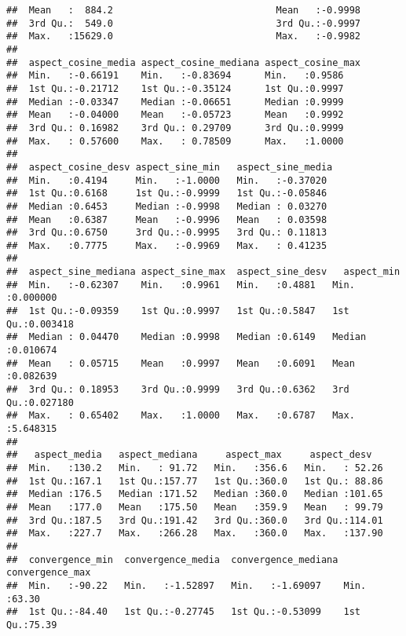 \documentclass[11pt,]{article}
\begin{document}
\begin{verbatim}
##  Mean   :  884.2                             Mean   :-0.9998  
##  3rd Qu.:  549.0                             3rd Qu.:-0.9997  
##  Max.   :15629.0                             Max.   :-0.9982  
##                                                               
##  aspect_cosine_media aspect_cosine_mediana aspect_cosine_max
##  Min.   :-0.66191    Min.   :-0.83694      Min.   :0.9586   
##  1st Qu.:-0.21712    1st Qu.:-0.35124      1st Qu.:0.9997   
##  Median :-0.03347    Median :-0.06651      Median :0.9999   
##  Mean   :-0.04000    Mean   :-0.05723      Mean   :0.9992   
##  3rd Qu.: 0.16982    3rd Qu.: 0.29709      3rd Qu.:0.9999   
##  Max.   : 0.57600    Max.   : 0.78509      Max.   :1.0000   
##                                                             
##  aspect_cosine_desv aspect_sine_min   aspect_sine_media 
##  Min.   :0.4194     Min.   :-1.0000   Min.   :-0.37020  
##  1st Qu.:0.6168     1st Qu.:-0.9999   1st Qu.:-0.05846  
##  Median :0.6453     Median :-0.9998   Median : 0.03270  
##  Mean   :0.6387     Mean   :-0.9996   Mean   : 0.03598  
##  3rd Qu.:0.6750     3rd Qu.:-0.9995   3rd Qu.: 0.11813  
##  Max.   :0.7775     Max.   :-0.9969   Max.   : 0.41235  
##                                                         
##  aspect_sine_mediana aspect_sine_max  aspect_sine_desv   aspect_min      
##  Min.   :-0.62307    Min.   :0.9961   Min.   :0.4881   Min.   :0.000000  
##  1st Qu.:-0.09359    1st Qu.:0.9997   1st Qu.:0.5847   1st Qu.:0.003418  
##  Median : 0.04470    Median :0.9998   Median :0.6149   Median :0.010674  
##  Mean   : 0.05715    Mean   :0.9997   Mean   :0.6091   Mean   :0.082639  
##  3rd Qu.: 0.18953    3rd Qu.:0.9999   3rd Qu.:0.6362   3rd Qu.:0.027180  
##  Max.   : 0.65402    Max.   :1.0000   Max.   :0.6787   Max.   :5.648315  
##                                                                          
##   aspect_media   aspect_mediana     aspect_max     aspect_desv    
##  Min.   :130.2   Min.   : 91.72   Min.   :356.6   Min.   : 52.26  
##  1st Qu.:167.1   1st Qu.:157.77   1st Qu.:360.0   1st Qu.: 88.86  
##  Median :176.5   Median :171.52   Median :360.0   Median :101.65  
##  Mean   :177.0   Mean   :175.50   Mean   :359.9   Mean   : 99.79  
##  3rd Qu.:187.5   3rd Qu.:191.42   3rd Qu.:360.0   3rd Qu.:114.01  
##  Max.   :227.7   Max.   :266.28   Max.   :360.0   Max.   :137.90  
##                                                                   
##  convergence_min  convergence_media  convergence_mediana convergence_max
##  Min.   :-90.22   Min.   :-1.52897   Min.   :-1.69097    Min.   :63.30  
##  1st Qu.:-84.40   1st Qu.:-0.27745   1st Qu.:-0.53099    1st Qu.:75.39  

\end{verbatim}
\end{document}
